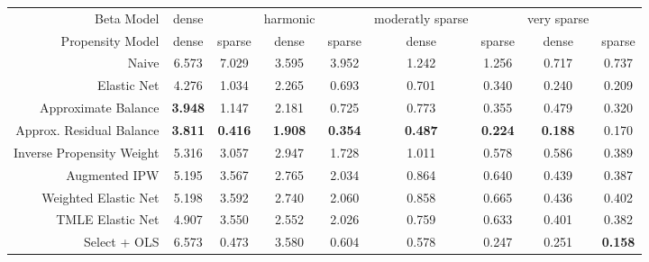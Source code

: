 \begin{table}[ht]
\centering
\begin{tabular}{|r|cc|cc|cc|cc|}
   \hline
Beta Model & dense &  & harmonic &  & moderatly sparse &  & very sparse &  \\ 
  Propensity Model & dense & sparse & dense & sparse & dense & sparse & dense & sparse \\ 
   \hline
Naive & 6.573 & 7.029 & 3.595 & 3.952 & 1.242 & 1.256 & 0.717 & 0.737 \\ 
  Elastic Net & 4.276 & 1.034 & 2.265 & 0.693 & 0.701 & 0.340 & 0.240 & 0.209 \\ 
   \hline
Approximate Balance &  \bf 3.948 & 1.147 & 2.181 & 0.725 & 0.773 & 0.355 & 0.479 & 0.320 \\ 
  Approx. Residual Balance &  \bf 3.811 &  \bf 0.416 &  \bf 1.908 &  \bf 0.354 &  \bf 0.487 &  \bf 0.224 &  \bf 0.188 & 0.170 \\ 
   \hline
Inverse Propensity Weight & 5.316 & 3.057 & 2.947 & 1.728 & 1.011 & 0.578 & 0.586 & 0.389 \\ 
  Augmented IPW & 5.195 & 3.567 & 2.765 & 2.034 & 0.864 & 0.640 & 0.439 & 0.387 \\ 
   \hline
Weighted Elastic Net & 5.198 & 3.592 & 2.740 & 2.060 & 0.858 & 0.665 & 0.436 & 0.402 \\ 
  TMLE Elastic Net & 4.907 & 3.550 & 2.552 & 2.026 & 0.759 & 0.633 & 0.401 & 0.382 \\ 
   \hline
Select + OLS & 6.573 & 0.473 & 3.580 & 0.604 & 0.578 & 0.247 & 0.251 &  \bf 0.158 \\ 
   \hline
\end{tabular}
\end{table}
